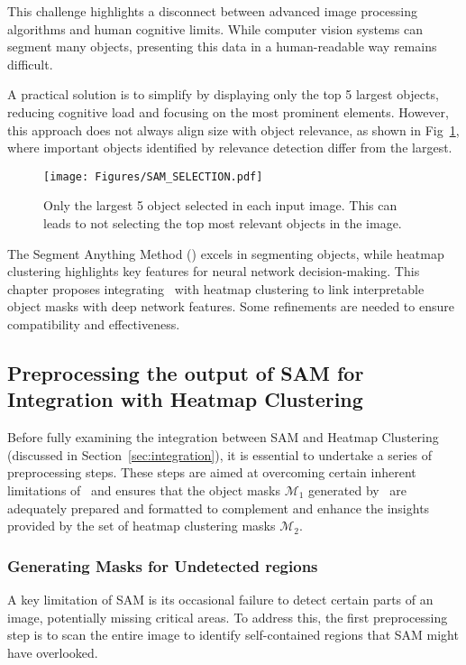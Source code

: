 This challenge highlights a disconnect between advanced image processing algorithms and human cognitive limits. While computer vision systems can segment many objects, presenting this data in a human-readable way remains difficult.

A practical solution is to simplify by displaying only the top 5 largest objects, reducing cognitive load and focusing on the most prominent elements. However, this approach does not always align size with object relevance, as shown in Fig~\ref{Fig:SAM_nor_right}, where important objects identified by relevance detection differ from the largest.

\begin{figure}[ht!]
\begin{center}
\texttt{[image: Figures/SAM\_SELECTION.pdf]}
\end{center}
\caption{Only the largest 5 object selected in each input image. This can leads to not selecting the top most relevant objects in the image.}
\label{Fig:SAM_nor_right}
\end{figure} 

The Segment Anything Method (\SAM) excels in segmenting objects, while heatmap clustering highlights key features for neural network decision-making. This chapter proposes integrating \SAM\ with heatmap clustering to link interpretable object masks with deep network features. Some refinements are needed to ensure compatibility and effectiveness.

\subsection{Preprocessing the output of SAM for Integration with Heatmap Clustering}

Before fully examining the integration between SAM and Heatmap Clustering (discussed in Section~\ref{sec:integration}), it is essential to undertake a series of preprocessing steps. These steps are aimed at overcoming certain inherent limitations of \SAM\ and ensures that the object masks $\mathcal{M}_1$ generated by \SAM\ are adequately prepared and formatted to complement and enhance the insights provided by the set of heatmap clustering masks $\mathcal{M}_2$.

\subsubsection{Generating Masks for Undetected regions}

A key limitation of SAM is its occasional failure to detect certain parts of an image, potentially missing critical areas. To address this, the first preprocessing step is to scan the entire image to identify self-contained regions that SAM might have overlooked.

